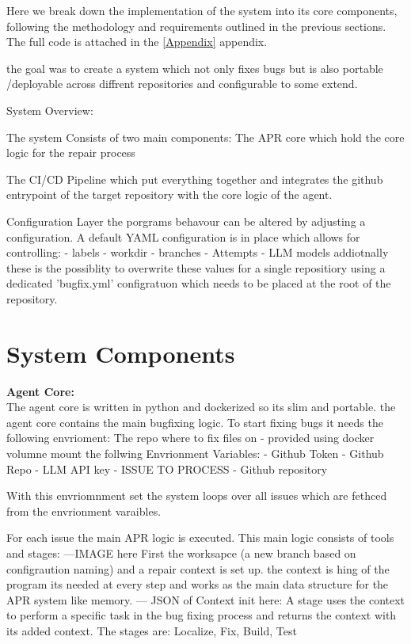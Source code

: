 Here we break down the implementation of the system into its core components, following the methodology and requirements outlined in the previous sections. The full code is attached in the \ref{Appendix} appendix.

the goal was to create a system which not only fixes bugs but is also portable /deployable across diffrent repositories and configurable to some extend.


System Overview:

The system Consists of two main components:
The APR core which hold the core logic for the repair process

The CI/CD Pipeline which put everything together and integrates the github entrypoint of the target repository with the core logic of the agent.

Configuration Layer
the porgrams behavour can be altered by adjusting a configuration.
A default YAML configuration is in place which allows for controlling:
- labels
- workdir
- branches
- Attempts
- LLM models
addiotnally these is the possiblity to overwrite these values for a single repositiory using a dedicated 'bugfix.yml' configratuon which needs to be placed at the root of the repository.

\section{System Components}
\textbf{Agent Core:}\\
The agent core is written in python and dockerized so its slim and portable.
the agent core contains the main bugfixing logic.
To start fixing bugs it needs the following envrioment:
The repo where to fix files on - provided using docker volumne mount
the follwing Envrionment Variables:
- Github Token
- Github Repo
- LLM API key
- ISSUE TO PROCESS
- Github repository

With this envriomnment set the system loops over all issues which are fethced from the envrionment varaibles.

For each issue the main APR logic is executed. This main logic consists of tools and stages:
---IMAGE here
First the worksapce (a new branch based on configraution naming) and a repair context is set up. the context is hing of the program its needed at every step and works as the main data structure for the APR system like memory.
--- JSON of Context init here:
A stage uses the context to perform a specific task in the bug fixing process and returns the context with its added context. The stages are: Localize, Fix, Build, Test


